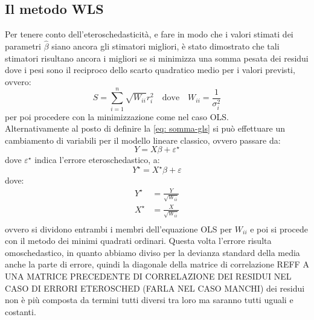 \documentclass[]{article}
\begin{document}
\subsection{Il metodo WLS}
Per tenere conto dell'eteroschedasticità, e fare in modo che i valori stimati dei parametri $\hat{\beta}$ siano ancora gli stimatori migliori, è stato dimostrato che tali stimatori risultano ancora i migliori se si minimizza una somma pesata dei residui dove i pesi sono il reciproco dello scarto quadratico medio per i valori previsti, ovvero:
\begin{equation}
S = \sum_{i=1}^{n} \sqrt{W_{ii}} r_i^2 \quad \text{dove}\quad W_{ii} = \frac{1}{\sigma_i^2} 
\label{eq: somma-gls}
\end{equation}
per poi procedere con la minimizzazione come nel caso OLS. \\
Alternativamente al posto di definire la \eqref{eq: somma-gls} si può effettuare un cambiamento di variabili per il modello lineare classico, ovvero passare da:
\begin{equation}
Y = X\beta + \varepsilon^\star
\label{eq: regressione-lineare-eterosched}
\end{equation} 
dove $\varepsilon^\star$ indica l'errore eteroschedastico, a:
\begin{equation}
Y^\star = X^\star\beta + \varepsilon
\end{equation}
dove:
\begin{equation}
\begin{split}
Y^\star &= \frac{Y}{\sqrt{W_{ii}}} \\
X^\star &= \frac{X}{\sqrt{W_{ii}}} \\
\end{split}
\end{equation}
ovvero si dividono entrambi i membri dell'equazione OLS per $W_{ii}$ e poi si procede con il metodo dei minimi quadrati ordinari. Questa volta l'errore risulta omoschedastico, in quanto abbiamo diviso per la devianza standard della media anche la parte di errore, quindi la diagonale della matrice di correlazione REFF A UNA MATRICE PRECEDENTE DI CORRELAZIONE DEI RESIDUI NEL CASO DI ERRORI ETEROSCHED (FARLA NEL CASO MANCHI) dei residui non è più composta da termini tutti diversi tra loro ma saranno tutti uguali e costanti.
\end{document}
